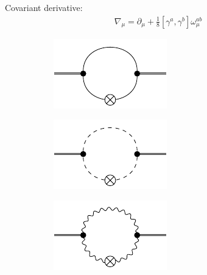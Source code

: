 Covariant derivative:
\begin{align}
	\nabla_{\mu} = \partial_{\mu} + \frac{1}{8}\left[\gamma^{a}, \gamma^{b}\right]\omega_{\mu}^{ab}
\end{align}
\blindtext
 \begin{figure}[t]
 \centering
 \hfill
 \begin{subfigure}{0.3\textwidth} 
	\includegraphics[width=\textwidth]{figs/TikZ/fermion_contribution}
 \end{subfigure}
 \hfill
 \begin{subfigure}{0.3\textwidth} 
 	\includegraphics[width=\textwidth]{figs/TikZ/scalar_contribution}
 \end{subfigure} 
 \hfill
 \begin{subfigure}{0.3\textwidth} 
 	\includegraphics[width=\textwidth]{figs/TikZ/gauge_field_contribution}

\end{subfigure}
\end{figure}
